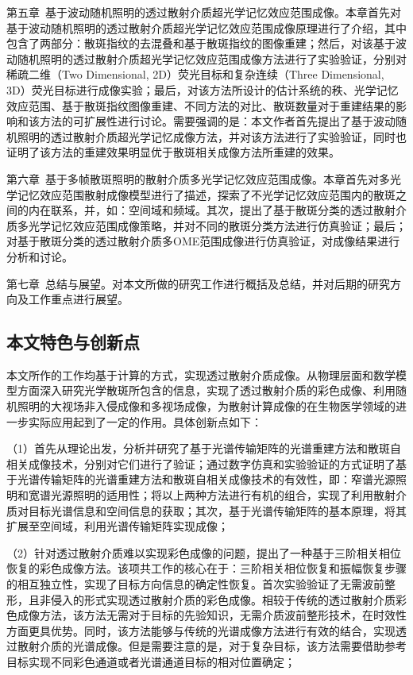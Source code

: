 第五章\  基于波动随机照明的透过散射介质超光学记忆效应范围成像。本章首先对基于波动随机照明的透过散射介质超光学记忆效应范围成像原理进行了介绍，其中包含了两部分：散斑指纹的去混叠和基于散斑指纹的图像重建；然后，对该基于波动随机照明的透过散射介质超光学记忆效应范围成像方法进行了实验验证，分别对稀疏二维（Two Dimensional, 2D）荧光目标和复杂连续（Three Dimensional, 3D）荧光目标进行成像实验；最后，对该方法所设计的估计系统的秩、光学记忆效应范围、基于散斑指纹图像重建、不同方法的对比、散斑数量对于重建结果的影响和该方法的可扩展性进行讨论。需要强调的是：本文作者首先提出了基于波动随机照明的透过散射介质超光学记忆成像方法，并对该方法进行了实验验证，同时也证明了该方法的重建效果明显优于散斑相关成像方法所重建的效果。

第六章\ 基于多帧散斑照明的散射介质多光学记忆效应范围成像。本章首先对多光学记忆效应范围散射成像模型进行了描述，探索了不光学记忆效应范围内的散斑之间的内在联系，并，如：空间域和频域。其次，提出了基于散斑分类的透过散射介质多光学记忆效应范围成像策略，并对不同的散斑分类方法进行仿真验证；最后；对基于散斑分类的透过散射介质多OME范围成像进行仿真验证，对成像结果进行分析和讨论。

第七章\ 总结与展望。对本文所做的研究工作进行概括及总结，并对后期的研究方向及工作重点进行展望。

\subsection{本文特色与创新点}

本文所作的工作均基于计算的方式，实现透过散射介质成像。从物理层面和数学模型方面深入研究光学散斑所包含的信息，实现了透过散射介质的彩色成像、利用随机照明的大视场非入侵成像和多视场成像，为散射计算成像的在生物医学领域的进一步实际应用起到了一定的作用。具体创新点如下：

（1）首先从理论出发，分析并研究了基于光谱传输矩阵的光谱重建方法和散斑自相关成像技术，分别对它们进行了验证；通过数字仿真和实验验证的方式证明了基于光谱传输矩阵的光谱重建方法和散斑自相关成像技术的有效性，即：窄谱光源照明和宽谱光源照明的适用性；将以上两种方法进行有机的组合，实现了利用散射介质对目标光谱信息和空间信息的获取；其次，基于光谱传输矩阵的基本原理，将其扩展至空间域，利用光谱传输矩阵实现成像；

（2）针对透过散射介质难以实现彩色成像的问题，提出了一种基于三阶相关相位恢复的彩色成像方法。该项共工作的核心在于：三阶相关相位恢复和振幅恢复步骤的相互独立性，实现了目标方向信息的确定性恢复。首次实验验证了无需波前整形，且非侵入的形式实现透过散射介质的彩色成像。相较于传统的透过散射介质彩色成像方法，该方法无需对于目标的先验知识，无需介质波前整形技术，在时效性方面更具优势。同时，该方法能够与传统的光谱成像方法进行有效的结合，实现透过散射介质的光谱成像。但是需要注意的是，对于复杂目标，该方法需要借助参考目标实现不同彩色通道或者光谱通道目标的相对位置确定；

